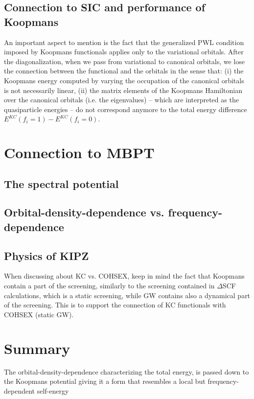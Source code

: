 \subsection{Connection to SIC and performance of Koopmans}
An important aspect to mention is the fact that the generalized PWL condition imposed by Koopmans functionals applies only to the variational orbitals. After the diagonalization, when we pass from variational to canonical orbitals, we lose the connection between the functional and the orbitals in the sense that: (i) the Koopmans energy computed by varying the occupation of the canonical orbitals is not necessarily linear, (ii) the matrix elements of the Koopmans Hamiltonian over the canonical orbitals (i.e. the eigenvalues) -- which are interpreted as the quasiparticle energies -- do not correspond anymore to the total energy difference $E^{KC}(f_i=1)-E^{KC}(f_i=0)$.

\section{Connection to MBPT\label{sec:koopmans-vs-mbpt}}

\subsection{The spectral potential\label{sec:spectral-potential}}

\subsection{Orbital-density-dependence vs. frequency-dependence\label{sec:odd-vs-omega-dependence}}

\subsection{Physics of KIPZ\label{sec:kipz-cohsex}}
When discussing about KC vs. COHSEX, keep in mind the fact that Koopmans contain a part of the screening, similarly to the screening contained in $\Delta$SCF calculations, which is a static screening, while GW contains also a dynamical part of the screening. This is to support the connection of KC functionals with COHSEX (static GW).

\clearpage
\section{Summary\label{sec:ch3-summary}}
The orbital-density-dependence characterizing the total energy, is passed down to the Koopmans potential giving it a form that resembles a local but frequency-dependent self-energy